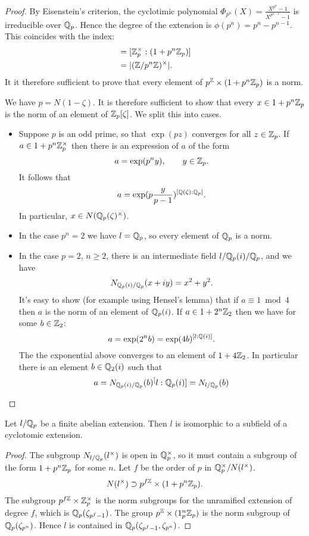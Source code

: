 \begin{proof}
	By Eisenstein's criterion, the cyclotimic polynomial
	$\Phi_{p^n}(X) = \frac{X^{p^n}-1}{X^{p^{n-1}}-1}$ is irreducible over ${\mathbb Q}_p$.
	Hence the degree of the extension is $\phi(p^n)=p^n - p^{n-1}$.
	This coincides with the index:
	\begin{align*}
		[\Q_p^\times : p^\Z \times (1+p^n \Z_p)]
		&= [\Z_p^\times : (1+p^n \Z_p)] \\
		&= | (\Z / p^n \Z)^\times |.
	\end{align*}
	It it therefore sufficient to prove that every element of $p^{\mathbb Z} \times (1+p^n {\mathbb Z}_p)$
	is a norm.

	We have $p = N(1-\zeta)$.
	It is therefore sufficient to show that every $x \in 1 + p^n {\mathbb Z}_p$
	is the norm of an element of ${\mathbb Z}_p[\zeta]$. We split this into cases.
	\begin{itemize}
		\item
		Suppose $p$ is an odd prime, so that $\exp(pz)$ converges for all $z\in {\mathbb Z}_p$.
		If $a \in 1 +p^n{\mathbb Z}_p^\times$ then there is an expression of $a$ of the form
		\[
			a = \exp(p^n y), \qquad y \in {\mathbb Z}_p.
		\]
		It follows that
		\[
			a= \exp(p\frac{y}{p-1}) ^{[{\mathbb Q}(\zeta):{\mathbb Q}_p]}.
		\]
		In particular, $x\in N({\mathbb Q}_p(\zeta)^\times)$.
		\item
		In the case $p^n = 2$ we have $l = {\mathbb Q}_p$, so every element of ${\mathbb Q}_p$ is a norm.
		\item
		In the case $p=2$, $n \ge 2$, there is an intermediate field $l / {\mathbb Q}_p(i) / {\mathbb Q}_p$,
		and we have
		\[
			N_{{\mathbb Q}_p(i) / {\mathbb Q}_p} (x+i y) = x^2 + y^2.
		\]
		It's easy to show (for example using Hensel's lemma) that if $a \equiv 1 \bmod 4$
		then $a$ is the norm of an element of ${\mathbb Q}_p(i)$.
		If $a \in 1 + 2^n {\mathbb Z}_2$ then we have for some $b \in {\mathbb Z}_2$:
		\[
			a = \exp(2^n b) = \exp(4b)^{[l:{\mathbb Q}(i)]}.
		\]
		The the exponential above converges to an element of $1+4{\mathbb Z}_2$.
		In particular there is an element $b \in {\mathbb Q}_2(i)$ such that
		\[
			a = N_{{\mathbb Q}_p(i)/{\mathbb Q}_p} (b) ^ [l:{\mathbb Q}_p(i)]
			= N_{l/{\mathbb Q}_p} (b)
		\]
	\end{itemize}
\end{proof}

\begin{theorem} \label{thm:local Kronecker Weber}
	Let $l/{\mathbb Q}_p$ be a finite abelian extension.
	Then $l$ is isomorphic to a subfield of a cyclotomic extension.
\end{theorem}

\begin{proof}
	The subgroup $N_{l/{\mathbb Q}_p}(l^\times)$ is open in ${\mathbb Q}_p^\times$, so it must contain
	a subgroup of the form $1+p^n{\mathbb Z}_p$ for some $n$.
	Let $f$ be the order of $p$ in ${\mathbb Q}_p^\times / N(l^\times)$.
	\[
		N(l^\times) \supset p^{f{\mathbb Z}} \times (1 + p^n{\mathbb Z}_p).
	\]
	The subgroup $p^{f{\mathbb Z}} \times {\mathbb Z}_p^\times$ is the norm subgroups for the unramified extension
	of degree $f$, which is ${\mathbb Q}_p(\zeta_{p^f-1})$.
	The group $p^{\mathbb Z} \times (1_p^n {\mathbb Z}_p)$ is the norm subgroup of ${\mathbb Q}_p(\zeta_{p^n})$.
	Hence $l$ is contained in ${\mathbb Q}_p(\zeta_{p^f-1}, \zeta_{p^n})$.
\end{proof}


